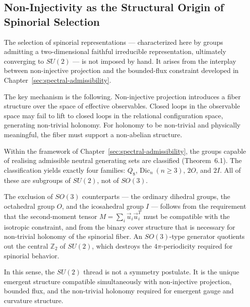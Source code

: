 \subsection{Non-Injectivity as the Structural Origin of Spinorial Selection}
  \label{subsec:non-injectivity-spinorial}

  The selection of spinorial representations --- characterized here by groups admitting
  a two-dimensional faithful irreducible representation, ultimately converging to $SU(2)$
  --- is not imposed by hand.
  It arises from the interplay between non-injective projection and the bounded-flux
  constraint developed in Chapter~\ref{sec:spectral-admissibility}.

  The key mechanism is the following.
  Non-injective projection introduces a fiber structure over the space of effective
  observables.
  Closed loops in the observable space may fail to lift to closed loops in the relational
  configuration space, generating non-trivial holonomy.
  For holonomy to be non-trivial and physically meaningful, the fiber must support a
  non-abelian structure.

  Within the framework of Chapter~\ref{sec:spectral-admissibility}, the groups capable
  of realising admissible neutral generating sets are classified (Theorem~6.1).
  The classification yields exactly four families:
  $Q_8$, $\mathrm{Dic}_n\ (n\geq 3)$, $2O$, and $2I$.
  All of these are subgroups of $SU(2)$, not of $SO(3)$.

  The exclusion of $SO(3)$ counterparts --- the ordinary dihedral groups, the octahedral
  group $O$, and the icosahedral group $I$ --- follows from the requirement that the
  second-moment tensor $M = \sum_i \vec{u}_i \vec{u}_i^T$ must be compatible with
  the isotropic constraint, and from the binary cover structure that is necessary for
  non-trivial holonomy of the spinorial fiber.
  An $SO(3)$-type generator quotients out the central $\mathbb{Z}_2$ of $SU(2)$, which
  destroys the $4\pi$-periodicity required for spinorial behavior.

  In this sense, the $SU(2)$ thread is not a symmetry postulate.
  It is the unique emergent structure compatible simultaneously with non-injective
  projection, bounded flux, and the non-trivial holonomy required for emergent gauge
  and curvature structure.
